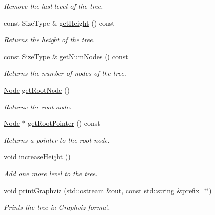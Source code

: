 \begin{DoxyCompactItemize}
\begin{DoxyCompactList}\small\item\em Remove the last level of the tree. \item\end{DoxyCompactList}\item 
const SizeType \& \hyperlink{class_complete_binary_tree_a2b51ae89ab242c2ce7de8ec90b963b34}{getHeight} () const 
\begin{DoxyCompactList}\small\item\em Returns the height of the tree. \item\end{DoxyCompactList}\item 
const SizeType \& \hyperlink{class_complete_binary_tree_a017457f2cc1b4fe7d6ffd8f9df4d2166}{getNumNodes} () const 
\begin{DoxyCompactList}\small\item\em Returns the number of nodes of the tree. \item\end{DoxyCompactList}\item 
\hyperlink{class_complete_binary_tree_1_1_node}{Node} \hyperlink{class_complete_binary_tree_a6238107a4a2cd42daf790d3350c30bf6}{getRootNode} ()
\begin{DoxyCompactList}\small\item\em Returns the root node. \item\end{DoxyCompactList}\item 
\hyperlink{class_complete_binary_tree_1_1_node}{Node} $\ast$ \hyperlink{class_complete_binary_tree_a0c56d34b6281450f6e31b1b745dd2879}{getRootPointer} () const 
\begin{DoxyCompactList}\small\item\em Returns a pointer to the root node. \item\end{DoxyCompactList}\item 
\hypertarget{class_complete_binary_tree_abef64512adb3b9ff4b1bb15b67dcf22b}{
void \hyperlink{class_complete_binary_tree_abef64512adb3b9ff4b1bb15b67dcf22b}{increaseHeight} ()}
\label{class_complete_binary_tree_abef64512adb3b9ff4b1bb15b67dcf22b}

\begin{DoxyCompactList}\small\item\em Add one more level to the tree. \item\end{DoxyCompactList}\item 
void \hyperlink{class_complete_binary_tree_a5fa6e7c4fa1985f79ce83361384e69ea}{printGraphviz} (std::ostream \&out, const std::string \&prefix=\char`\"{}\char`\"{})
\begin{DoxyCompactList}\small\item\em Prints the tree in Graphviz format. \item\end{DoxyCompactList}\end{DoxyCompactItemize}
